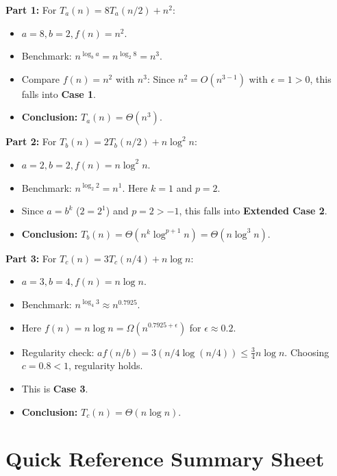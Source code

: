 \documentclass[11pt,a4paper]{article}
\begin{document}
\begin{definitionbox}
\textbf{Part 1:} For $T_a(n) = 8 T_a(n/2) + n^2$:
\begin{itemize}[itemsep=1pt]
    \item $a = 8, b = 2, f(n) = n^2$.
    \item Benchmark: $n^{\log_b a} = n^{\log_2 8} = n^3$.
    \item Compare $f(n) = n^2$ with $n^3$: Since $n^2 = O(n^{3 - 1})$ with $\epsilon = 1 > 0$, this falls into \textbf{Case 1}.
    \item \textbf{Conclusion:} $T_a(n) = \Theta(n^3)$.
\end{itemize}

\textbf{Part 2:} For $T_b(n) = 2 T_b(n/2) + n \log^2 n$:
\begin{itemize}[itemsep=1pt]
    \item $a = 2, b = 2, f(n) = n \log^2 n$.
    \item Benchmark: $n^{\log_2 2} = n^1$. Here $k = 1$ and $p = 2$.
    \item Since $a = b^k$ ($2 = 2^1$) and $p = 2 > -1$, this falls into \textbf{Extended Case 2}.
    \item \textbf{Conclusion:} $T_b(n) = \Theta(n^k \log^{p+1} n) = \Theta(n \log^3 n)$.
\end{itemize}

\textbf{Part 3:} For $T_c(n) = 3 T_c(n/4) + n \log n$:
\begin{itemize}[itemsep=1pt]
    \item $a = 3, b = 4, f(n) = n \log n$.
    \item Benchmark: $n^{\log_4 3} \approx n^{0.7925}$.
    \item Here $f(n) = n \log n = \Omega(n^{0.7925 + \epsilon})$ for $\epsilon \approx 0.2$.
    \item Regularity check: $a f(n/b) = 3(n/4 \log(n/4)) \le \frac{3}{4} n \log n$. Choosing $c = 0.8 < 1$, regularity holds.
    \item This is \textbf{Case 3}.
    \item \textbf{Conclusion:} $T_c(n) = \Theta(n \log n)$.
\end{itemize}
\end{definitionbox}

\newpage
\section{Quick Reference Summary Sheet}
\end{document}
